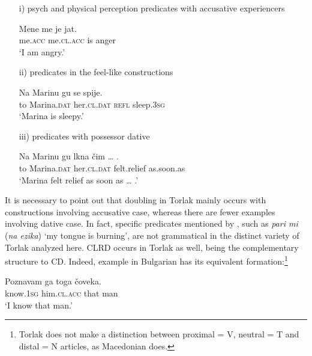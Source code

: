 \documentclass[output=paper,
colorlinks,
citecolor=brown,
newtxmath
]{langscibook}
\begin{document}
\begin{itemize}
\item[i)] psych and physical perception predicates with accusative experiencers


\ea\label{ex:11}
\gll Mene   me        je  jat.\\
     me.\textsc{acc} me.\textsc{cl.acc} is  anger \\
\glt `I am angry.'
\z
\item[ii)] predicates in the feel-like constructions


\ea\label{ex:12}
\gll Na Marinu     gu         se spije.\\
     to Marina.\textsc{dat} her.\textsc{cl.dat} \textsc{refl} sleep.\textsc{3sg}\\
\glt `Marina is sleepy.'
\z

    \largerpage[2]

\item[iii)] predicates with possessor dative


\ea\label{ex:13}
\gll Na Marinu     gu         lkna      čim {\dots} .\\
     to Marina.\textsc{dat} her.\textsc{cl.dat} {felt.relief} {as.soon.as}\\
\glt `Marina felt relief as soon as {\dots} .'
\z

\end{itemize}

\noindent It is necessary to point out that doubling in Torlak mainly occurs with constructions involving accusative case, whereas there are fewer examples involving dative case. In fact, specific predicates mentioned by \citet{Cinque.Krapova2008}, such as \textit{pari mi} (\textit{na ezika}) `my tongue is burning', are not grammatical in the distinct variety of Torlak analyzed here.
CLRD occurs in Torlak as well, being the complementary structure to CD. Indeed, example  in Bulgarian has its equivalent formation:\footnote{Torlak does not make a distinction between proximal = V, neutral = T and distal = N articles, as Macedonian does.}


\ea\label{ex:14}
\gll Poznavam ga          toga čoveka.\\
     know.\textsc{1sg} him.\textsc{cl.acc} that man \\
\glt `I know that man.'
\z
\end{document}
